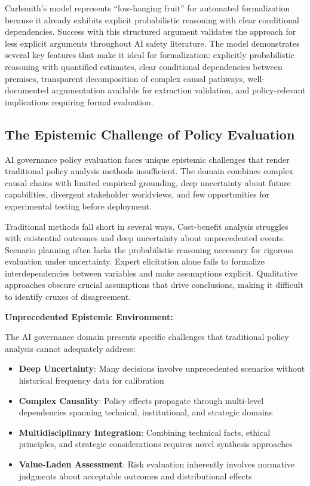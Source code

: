 \documentclass[
  11pt,
  letterpaper,
]{book}
\providecommand{\tightlist}{%
  \setlength{\itemsep}{0pt}\setlength{\parskip}{0pt}}
\begin{document}
Carlsmith's model represents ``low-hanging fruit'' for automated
formalization because it already exhibits explicit probabilistic
reasoning with clear conditional dependencies. Success with this
structured argument validates the approach for less explicit arguments
throughout AI safety literature. The model demonstrates several key
features that make it ideal for formalization: explicitly probabilistic
reasoning with quantified estimates, clear conditional dependencies
between premises, transparent decomposition of complex causal pathways,
well-documented argumentation available for extraction validation, and
policy-relevant implications requiring formal evaluation.

\subsection{The Epistemic Challenge of Policy
Evaluation}\label{sec-epistemic-challenge}

AI governance policy evaluation faces unique epistemic challenges that
render traditional policy analysis methods insufficient. The domain
combines complex causal chains with limited empirical grounding, deep
uncertainty about future capabilities, divergent stakeholder worldviews,
and few opportunities for experimental testing before deployment.

Traditional methods fall short in several ways. Cost-benefit analysis
struggles with existential outcomes and deep uncertainty about
unprecedented events. Scenario planning often lacks the probabilistic
reasoning necessary for rigorous evaluation under uncertainty. Expert
elicitation alone fails to formalize interdependencies between variables
and make assumptions explicit. Qualitative approaches obscure crucial
assumptions that drive conclusions, making it difficult to identify
cruxes of disagreement.

\textbf{Unprecedented Epistemic Environment:}

The AI governance domain presents specific challenges that traditional
policy analysis cannot adequately address:

\begin{itemize}
\tightlist
\item
  \textbf{Deep Uncertainty}: Many decisions involve unprecedented
  scenarios without historical frequency data for calibration
\item
  \textbf{Complex Causality}: Policy effects propagate through
  multi-level dependencies spanning technical, institutional, and
  strategic domains
\item
  \textbf{Multidisciplinary Integration}: Combining technical facts,
  ethical principles, and strategic considerations requires novel
  synthesis approaches
\item
  \textbf{Value-Laden Assessment}: Risk evaluation inherently involves
  normative judgments about acceptable outcomes and distributional
  effects
\end{itemize}
\end{document}

